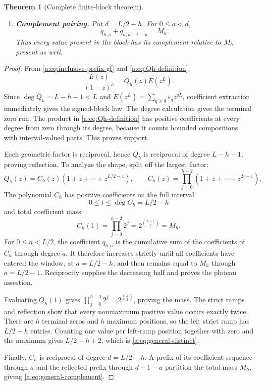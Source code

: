 \documentclass[11pt,a4paper,oneside,openany]{book}
\numberwithin{equation}{chapter}
\newtheorem{theorem}{Theorem}[chapter]
\theoremstyle{definition}
\theoremstyle{remark}
\newcommand{\eps}{\varepsilon}
\begin{document}
\begin{theorem}[Complete finite-block theorem]
\begin{enumerate}
\item \textbf{Complement pairing.}  Put \(d=L/2-h\).  For
\(0\le a<d\),
\begin{equation}
 \boxed{q_{h,a}+q_{h,d-1-a}=M_h.}
 \label{a:eq:general-complement}
\end{equation}
Thus every value present in the block has its complement relative to \(M_h\)
present as well.
\end{enumerate}
\end{theorem}

\begin{proof}
From \eqref{a:eq:inclusive-prefix-gf} and \eqref{a:eq:Qh-definition},
\begin{equation}
 \frac{E(z)}{(1-z)^h}=Q_h(z)E(z^L).
 \label{a:eq:block-factorization}
\end{equation}
Since \(\deg Q_h=L-h-1<L\) and
\(E(z^L)=\sum_{q\ge0}\eps_qz^{qL}\), coefficient extraction immediately
gives the signed-block law.  The degree calculation gives the terminal zero
run.  The product in \eqref{a:eq:Qh-definition} has positive coefficients at
every degree from zero through its degree, because it counts bounded
compositions with interval-valued parts.  This proves support.

Each geometric factor is reciprocal, hence \(Q_h\) is reciprocal of degree
\(L-h-1\), proving reflection.  To analyze the shape, split off the largest
factor:
\begin{equation}
 Q_h(z)=C_h(z)(1+z+\cdots+z^{L/2-1}),
 \qquad
 C_h(z)=\prod_{j=0}^{h-2}(1+z+\cdots+z^{2^j-1}).
 \label{a:eq:Ch-split}
\end{equation}
The polynomial \(C_h\) has positive coefficients on the full interval
\begin{equation}
 0\le t\le\deg C_h=L/2-h
 \label{a:eq:Ch-degree}
\end{equation}
and total coefficient mass
\begin{equation}
 C_h(1)=\prod_{j=0}^{h-2}2^j
 =2^{\binom{h-1}{2}}=M_h.
 \label{a:eq:Ch-mass}
\end{equation}
For \(0\le a<L/2\), the coefficient \(q_{h,a}\) is the cumulative sum of
the coefficients of \(C_h\) through degree \(a\).  It therefore increases
strictly until all coefficients have entered the window, at
\(a=L/2-h\), and then remains equal to \(M_h\) through \(a=L/2-1\).
Reciprocity supplies the decreasing half and proves the plateau assertion.

Evaluating \(Q_h(1)\) gives
\(
\prod_{j=0}^{h-1}2^j=2^{\binom h2}
\), proving the mass.  The strict ramps and reflection show that every
nonmaximum positive value occurs exactly twice.  There are \(h\) terminal
zeros and \(h\) maximum positions, so the left strict ramp has
\(L/2-h\) entries.  Counting one value per left-ramp position together with
zero and the maximum gives \(L/2-h+2\), which is
\eqref{a:eq:general-distinct}.

Finally, \(C_h\) is reciprocal of degree \(d=L/2-h\).  A prefix of its
coefficient sequence through \(a\) and the reflected prefix through
\(d-1-a\) partition the total mass \(M_h\), giving
\eqref{a:eq:general-complement}.
\end{proof}
\end{document}
